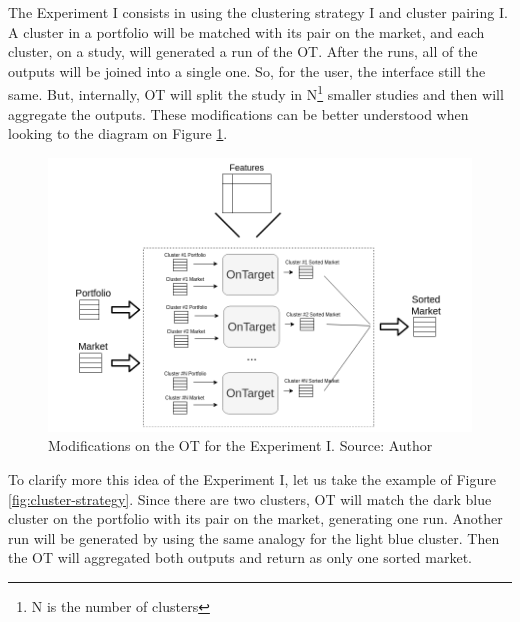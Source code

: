 The Experiment I consists in using the clustering strategy I and cluster pairing I. A cluster in a portfolio will be matched with its pair on the market, and each cluster, on a study, will generated a run of the OT. After the runs, all of the outputs will be joined into a single one. So, for the user, the interface still the same. But, internally, OT will split the study in N\footnote{N is the number of clusters} smaller studies and then will aggregate the outputs. These modifications can be better understood when looking to the diagram on Figure \ref{fig:one-run-each-cluster}. 

\begin{figure}[h]
   \centering
   \includegraphics[width=\linewidth]{fig/ch3-one-run-each-cluster.png}
   \caption{Modifications on the OT for the Experiment I. Source: Author}
   \label{fig:one-run-each-cluster}
\end{figure}

To clarify more this idea of the Experiment I, let us take the example of Figure \ref{fig:cluster-strategy}. Since there are two clusters, OT will match the dark blue cluster on the portfolio with its pair on the market, generating one run. Another run will be generated by using the same analogy for the light blue cluster. Then the OT will aggregated both outputs and return as only one sorted market.


